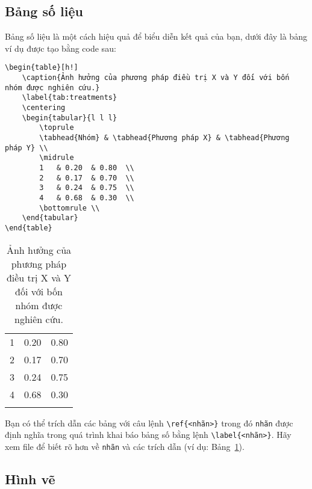 \subsection{Bảng số liệu}

Bảng số liệu là một cách hiệu quả để biểu diễn kết quả của bạn, dưới đây là bảng ví dụ được tạo bằng code sau:
\begin{Verbatim}
\begin{table}[h!]
	\caption{Ảnh hưởng của phương pháp điều trị X và Y đối với bốn nhóm được nghiên cứu.}
	\label{tab:treatments}
	\centering
	\begin{tabular}{l l l}
		\toprule
		\tabhead{Nhóm} & \tabhead{Phương pháp X} & \tabhead{Phương pháp Y} \\
		\midrule
		1	& 0.20	& 0.80	\\
		2	& 0.17	& 0.70	\\
		3	& 0.24	& 0.75	\\
		4	& 0.68	& 0.30	\\
		\bottomrule	\\
	\end{tabular}
\end{table}
\end{Verbatim}

\begin{table}[h!]
	\caption{Ảnh hưởng của phương pháp điều trị X và Y đối với bốn nhóm được nghiên cứu.}
	\label{tab:treatments}
	\centering
	\begin{tabular}{l l l}
		\toprule
		\tabhead{Nhóm} & \tabhead{Phương pháp X} & \tabhead{Phương pháp Y} \\
		\midrule
		1	& 0.20	& 0.80	\\
		2	& 0.17	& 0.70	\\
		3	& 0.24	& 0.75	\\
		4	& 0.68	& 0.30	\\
		\bottomrule	\\
	\end{tabular}
\end{table}

Bạn có thể trích dẫn các bảng với câu lệnh \verb|\ref{<nhãn>}| trong đó \verb|nhãn| được định nghĩa trong quá trình khai báo bảng số bằng lệnh \verb|\label{<nhãn>}|. Hãy xem file  để biết rõ hơn về \verb|nhãn| và các trích dẫn (ví dụ: Bảng~\ref{tab:treatments}).


\subsection{Hình vẽ}

